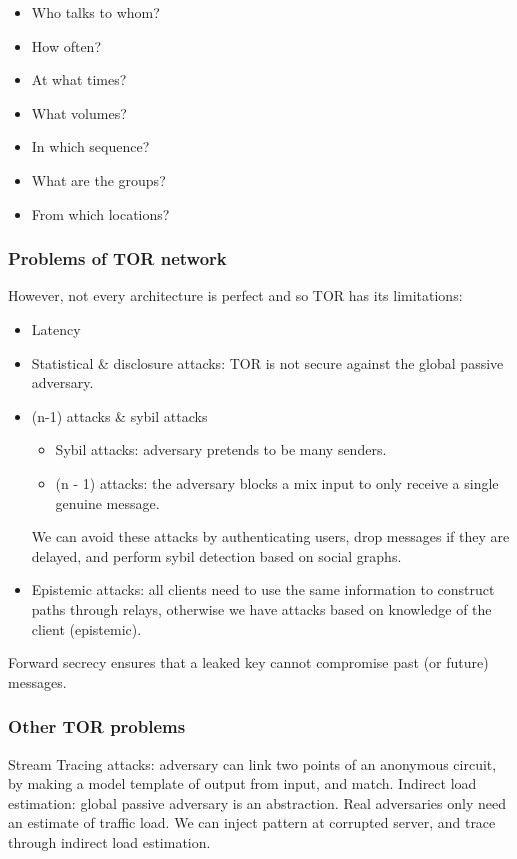 \begin{itemize}
    \item Who talks to whom?
    \item How often?
    \item At what times?
    \item What volumes?
    \item In which sequence?
    \item What are the groups?
    \item From which locations?
\end{itemize}

\subsubsection{Problems of TOR network}

However, not every architecture is perfect and so TOR has its limitations:

\begin{itemize}
    \item Latency
    \item Statistical & disclosure attacks: TOR is not secure against the global passive adversary.
    \item (n-1) attacks & sybil attacks
    \begin{itemize}
        \item Sybil attacks: adversary pretends to be many senders.
        \item (n - 1) attacks: the adversary blocks a mix input to only receive a single genuine message. 
    \end{itemize}
    We can avoid these attacks by authenticating users, drop messages if they are delayed, and perform sybil detection based on social graphs. 
    \item Epistemic attacks: all clients need to use the same information to construct paths through relays, otherwise we have attacks based on knowledge of the client (epistemic). 
\end{itemize}

Forward secrecy ensures that a leaked key cannot compromise past (or future) messages.

\subsubsection{Other TOR problems}

Stream Tracing attacks: adversary can link two points of an anonymous circuit, by making a model template of output from input, and match. \newline
Indirect load estimation: global passive adversary is an abstraction. Real adversaries only need an estimate of traffic load. We can inject pattern at corrupted server, and trace through indirect load estimation. 